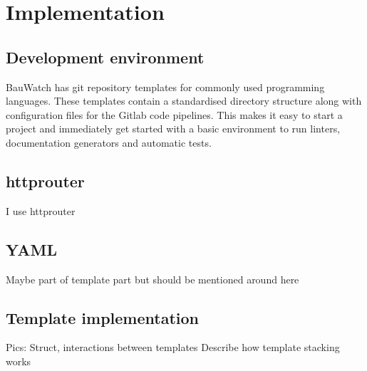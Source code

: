 \section{Implementation}
\subsection{Development environment}
BauWatch has git repository templates for commonly used programming languages. These templates contain a standardised directory structure along with configuration
files for the Gitlab code pipelines. This makes it easy to start a project and immediately get started with a basic environment to run linters, documentation
generators and automatic tests.

\subsection{httprouter}
I use httprouter

\subsection{YAML}
Maybe part of template part but should be mentioned around here

\subsection{Template implementation}
Pics:
Struct, interactions between templates
Describe how template stacking works